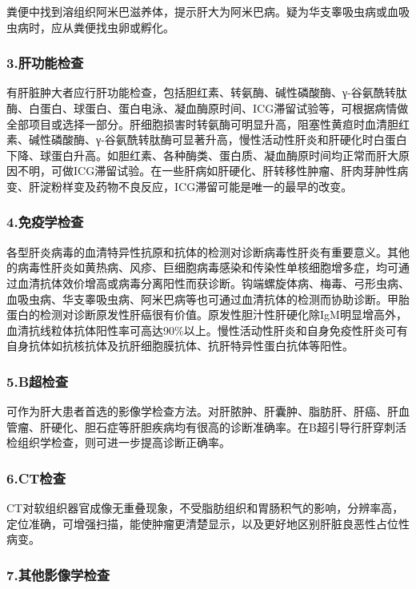粪便中找到溶组织阿米巴滋养体，提示肝大为阿米巴病。疑为华支睾吸虫病或血吸虫病时，应从粪便找虫卵或孵化。

\subsubsection{3.肝功能检查}

有肝脏肿大者应行肝功能检查，包括胆红素、转氨酶、碱性磷酸酶、γ-谷氨酰转肽酶、白蛋白、球蛋白、蛋白电泳、凝血酶原时间、ICG滞留试验等，可根据病情做全部项目或选择一部分。肝细胞损害时转氨酶可明显升高，阻塞性黄疸时血清胆红素、碱性磷酸酶、γ-谷氨酰转肽酶可显著升高，慢性活动性肝炎和肝硬化时白蛋白下降、球蛋白升高。如胆红素、各种酶类、蛋白质、凝血酶原时间均正常而肝大原因不明，可做ICG滞留试验。在一些肝病如肝硬化、肝转移性肿瘤、肝肉芽肿性病变、肝淀粉样变及药物不良反应，ICG滞留可能是唯一的最早的改变。

\subsubsection{4.免疫学检查}

各型肝炎病毒的血清特异性抗原和抗体的检测对诊断病毒性肝炎有重要意义。其他的病毒性肝炎如黄热病、风疹、巨细胞病毒感染和传染性单核细胞增多症，均可通过血清抗体效价增高或病毒分离阳性而获诊断。钩端螺旋体病、梅毒、弓形虫病、血吸虫病、华支睾吸虫病、阿米巴病等也可通过血清抗体的检测而协助诊断。甲胎蛋白的检测对诊断原发性肝癌很有价值。原发性胆汁性肝硬化除IgM明显增高外，血清抗线粒体抗体阳性率可高达90\%以上。慢性活动性肝炎和自身免疫性肝炎可有自身抗体如抗核抗体及抗肝细胞膜抗体、抗肝特异性蛋白抗体等阳性。

\subsubsection{5.B超检查}

可作为肝大患者首选的影像学检查方法。对肝脓肿、肝囊肿、脂肪肝、肝癌、肝血管瘤、肝硬化、胆石症等肝胆疾病均有很高的诊断准确率。在B超引导行肝穿刺活检组织学检查，则可进一步提高诊断正确率。

\subsubsection{6.CT检查}

CT对软组织器官成像无重叠现象，不受脂肪组织和胃肠积气的影响，分辨率高，定位准确，可增强扫描，能使肿瘤更清楚显示，以及更好地区别肝脏良恶性占位性病变。

\subsubsection{7.其他影像学检查}

